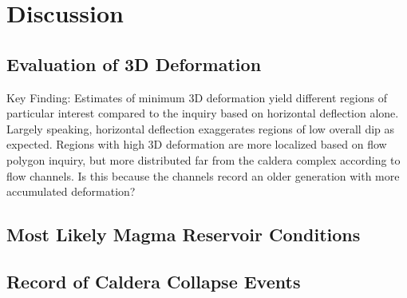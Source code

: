 \chapter{Discussion}

\section{Evaluation of 3D Deformation}
Key Finding: Estimates of minimum 3D deformation yield different regions of particular interest compared to the inquiry based on horizontal deflection alone. Largely speaking, horizontal deflection exaggerates regions of low overall dip as expected. Regions with high 3D deformation are more localized based on flow polygon inquiry, but more distributed far from the caldera complex according to flow channels. Is this because the channels record an older generation with more accumulated deformation? 
\section{Most Likely Magma Reservoir Conditions}
\section{Record of Caldera Collapse Events}